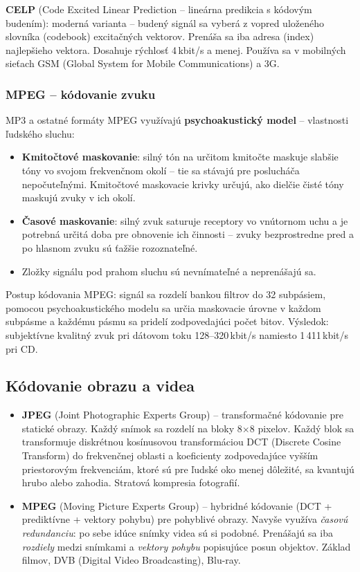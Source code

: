\textbf{CELP} (Code Excited Linear Prediction -- lineárna predikcia s kódovým
budením): moderná varianta -- budený signál sa vyberá z vopred uloženého slovníka
(codebook) excitačných vektorov. Prenáša sa iba adresa (index) najlepšieho vektora.
Dosahuje rýchlosť 4\,kbit/s a menej. Používa sa v mobilných sieťach GSM (Global
System for Mobile Communications) a 3G.

\subsubsection{MPEG -- kódovanie zvuku}

MP3 a ostatné formáty MPEG využívajú \textbf{psychoakustický model} -- vlastnosti
ľudského sluchu:

\begin{itemize}
    \item \textbf{Kmitočtové maskovanie}: silný tón na určitom kmitočte maskuje slabšie
        tóny vo svojom frekvenčnom okolí -- tie sa stávajú pre poslucháča nepočuteľnými.
        Kmitočtové maskovacie krivky určujú, ako dielčie čisté tóny maskujú zvuky
        v ich okolí.
    \item \textbf{Časové maskovanie}: silný zvuk saturuje receptory vo vnútornom uchu
        a je potrebná určitá doba pre obnovenie ich činnosti -- zvuky bezprostredne
        pred a po hlasnom zvuku sú ťažšie rozoznateľné.
    \item Zložky signálu pod prahom sluchu sú nevnímateľné a neprenášajú sa.
\end{itemize}

Postup kódovania MPEG: signál sa rozdelí bankou filtrov do 32 subpásiem, pomocou
psychoakustického modelu sa určia maskovacie úrovne v každom subpásme a každému
pásmu sa pridelí zodpovedajúci počet bitov. Výsledok: subjektívne kvalitný zvuk
pri dátovom toku 128--320\,kbit/s namiesto 1\,411\,kbit/s pri CD.

\subsection{Kódovanie obrazu a videa}

\begin{itemize}
    \item \textbf{JPEG} (Joint Photographic Experts Group) -- transformačné kódovanie
        pre statické obrazy. Každý snímok sa rozdelí na bloky 8$\times$8 pixelov.
        Každý blok sa transformuje diskrétnou kosínusovou transformáciou DCT
        (Discrete Cosine Transform) do frekvenčnej oblasti a koeficienty zodpovedajúce
        vyšším priestorovým frekvenciám, ktoré sú pre ľudské oko menej dôležité,
        sa kvantujú hrubo alebo zahodia. Stratová kompresia fotografií.
    \item \textbf{MPEG} (Moving Picture Experts Group) -- hybridné kódovanie (DCT +
        prediktívne + vektory pohybu) pre pohyblivé obrazy. Navyše využíva
        \textit{časovú redundanciu}: po sebe idúce snímky videa sú si podobné.
        Prenášajú sa iba \textit{rozdiely} medzi snímkami a \textit{vektory pohybu}
        popisujúce posun objektov. Základ filmov, DVB (Digital Video Broadcasting),
        Blu-ray.
\end{itemize}

